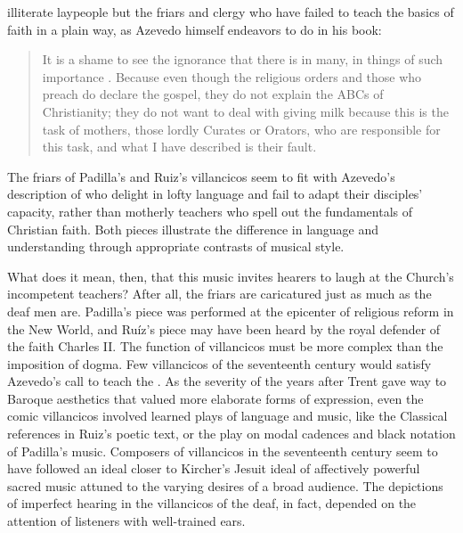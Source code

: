 illiterate laypeople but the friars and clergy who have failed to teach the
basics of faith in a plain way, as Azevedo himself endeavors to do in his book:
\begin{quote}
    It is a shame to see the ignorance that there is in many, in things of such
    importance \Dots{}.
    Because even though the religious orders and those who preach do declare the
    gospel, they do not explain the ABCs  of Christianity;
    they do not want to deal with giving milk because this is the task of
    mothers, those lordly Curates or Orators, who are responsible for this task,
    and what I have described is their fault.%
        \Autocite
        [27: .] 
        {Azevedo:Catecismo}
\end{quote}
The friars of Padilla's and Ruiz's villancicos seem to fit with Azevedo's
description of  who delight in lofty language and fail to
adapt their disciples' capacity, rather than motherly teachers who spell out the
fundamentals of Christian faith.
Both pieces illustrate the difference in language and understanding through
appropriate contrasts of musical style.

What does it mean, then, that this music invites hearers to laugh at the
Church's incompetent teachers? 
After all, the friars are caricatured just as much as the deaf men are.
Padilla's piece was performed at the epicenter of religious reform in the New
World, and Ruíz's piece may have been heard by the royal defender of the faith
Charles II.  %
The function of villancicos must be more complex than the imposition of dogma.
Few villancicos of the seventeenth century would satisfy Azevedo's call to teach
the .  
As the severity of the years after Trent gave way to Baroque aesthetics that
valued more elaborate forms of expression, even the comic villancicos involved
learned plays of language and music, like the Classical references in Ruiz's
poetic text, or the play on modal cadences and black notation of Padilla's
music.
Composers of villancicos in the seventeenth century seem to have followed an
ideal closer to Kircher's Jesuit ideal of affectively powerful sacred music
attuned to the varying desires of a broad audience.
The depictions of imperfect hearing in the villancicos of the deaf, in fact,
depended on the attention of listeners with well-trained ears.


